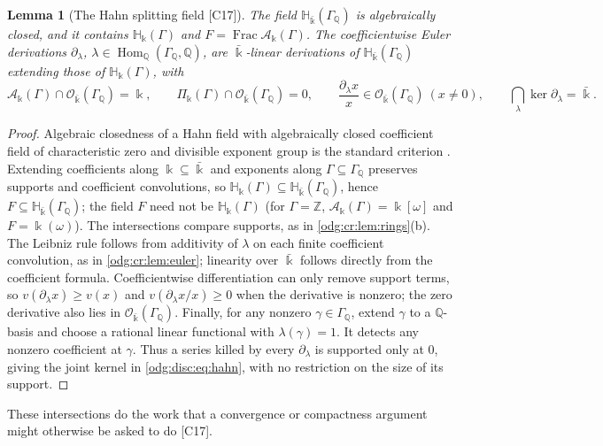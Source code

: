 \documentclass[11pt,oneside]{article}
\numberwithin{equation}{section}
\newtheorem{lemma}[lemma]{Lemma}
\theoremstyle{definition}
\theoremstyle{remark}
\newcommand{\Z}{\mathbb Z}
\newcommand{\Q}{\mathbb Q}
\newcommand{\Frac}{\operatorname{Frac}}
\newcommand{\src}[1]{\textup{\textsf{\small[#1]}}}
\newcommand{\crH}{\mathbb H_\Bbbk(\Gamma)}
\newcommand{\crA}{\mathcal A_\Bbbk(\Gamma)}
\newcommand{\crP}{\Pi_\Bbbk(\Gamma)}
\newcommand{\Hom}{\operatorname{Hom}}
\newcommand{\Hbar}{\mathbb H_{\bar\Bbbk}(\Gamma_\Q)}
\newcommand{\Obar}{\mathcal O_{\bar\Bbbk}(\Gamma_\Q)}
\begin{document}
\begin{lemma}[The Hahn splitting field \src{C17}]\label{odg:disc:lem:hahn}
The field $\Hbar$ is algebraically closed, and it contains $\crH$ and $F=\Frac\crA$.
The coefficientwise Euler derivations $\partial_\lambda$,
$\lambda\in\Hom_\Q(\Gamma_\Q,\Q)$, are $\bar\Bbbk$-linear derivations of $\Hbar$ extending
those of $\crH$, with
\begin{equation}\label{odg:disc:eq:hahn}
 \crA\cap\Obar=\Bbbk,\qquad \crP\cap\Obar=0,\qquad
 \frac{\partial_\lambda x}{x}\in\Obar\ (x\ne0),\qquad
 \bigcap_\lambda\ker\partial_\lambda=\bar\Bbbk .
\end{equation}
\end{lemma}
\begin{proof}
Algebraic closedness of a Hahn field with algebraically closed coefficient field of
characteristic zero and divisible exponent group is the standard criterion
\cite[Fact 2.1.1]{LM}. Extending coefficients along $\Bbbk\subseteq\bar\Bbbk$ and exponents
along $\Gamma\subseteq\Gamma_\Q$ preserves supports and coefficient convolutions, so
$\crH\subseteq\Hbar$, hence $F\subseteq\Hbar$; the field $F$ need not be $\crH$ (for
$\Gamma=\Z$, $\crA=\Bbbk[\omega]$ and $F=\Bbbk(\omega)$). The intersections compare supports,
as in \cref{odg:cr:lem:rings}(b). The Leibniz rule follows from additivity of $\lambda$
on each finite coefficient convolution, as in \cref{odg:cr:lem:euler}; linearity over
$\bar\Bbbk$ follows directly from the coefficient formula.
Coefficientwise differentiation can only remove support
terms, so $v(\partial_\lambda x)\ge v(x)$ and
$v(\partial_\lambda x/x)\ge0$ when the derivative is nonzero; the zero derivative also
lies in $\Obar$. Finally, for any nonzero $\gamma\in\Gamma_\Q$, extend $\gamma$ to a
$\Q$-basis and choose a rational linear functional with $\lambda(\gamma)=1$.
It detects any nonzero coefficient at $\gamma$. Thus a series killed by every
$\partial_\lambda$ is supported only at $0$, giving the joint kernel in
\eqref{odg:disc:eq:hahn}, with no restriction on the size of its support.
\end{proof}

These intersections do the work that a convergence or compactness argument might
otherwise be asked to do \src{C17}.
\end{document}
